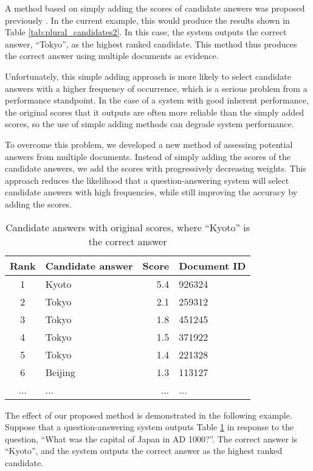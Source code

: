 A method based on simply adding the scores of candidate answers 
was proposed previously \cite{Dumis,takaki_ntcir3_qa}. 
In the current example, this would produce
the results shown in Table \ref{tab:plural_candidates2}. 
In this case, the system outputs the correct answer, ``Tokyo'', as the highest ranked candidate. 
This method thus produces the correct answer using multiple documents as evidence. 

Unfortunately, this simple adding approach 
is more likely to select candidate answers with 
a higher frequency of occurrence, which 
is a serious problem from a performance standpoint. 
In the case of a system with good inherent performance, 
the original scores that it outputs are often more 
reliable than the simply added scores, so
the use of simple adding methods can degrade
system performance. 

To overcome this problem, we developed a new method 
of assessing potential answers from multiple documents. 
Instead of simply adding the scores of the candidate answers, 
we add the scores with progressively decreasing weights. 
This approach reduces the likelihood 
that a question-answering system will select candidate answers with high frequencies, 
while still improving the accuracy by adding the scores. 

\begin{table}[t]
  \begin{center}
    \caption{Candidate answers with original scores, where ``Kyoto'' is the correct answer}
    \begin{tabular}{|c|l|r|l|} \hline
Rank & Candidate answer & Score & \multicolumn{1}{c|}{Document ID}\\\hline
1 & Kyoto & 5.4 & 926324\\
2 & Tokyo & 2.1 & 259312\\
3 & Tokyo & 1.8 & 451245\\
4 & Tokyo & 1.5 & 371922\\
5 & Tokyo & 1.4 & 221328\\
6 & Beijing & 1.3 &113127\\
... & ... & ...& ...\\\hline
\end{tabular}
\label{tab:plural_candidates3}
\end{center}
\end{table}

The effect of our proposed method is demonstrated in the following example. 
Suppose that a question-answering system outputs 
Table \ref{tab:plural_candidates3} in response to the question, 
``What was the capital of Japan in AD 1000?''. 
The correct answer is ``Kyoto'', 
and the system outputs the correct answer as the highest ranked candidate. 


